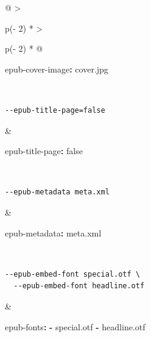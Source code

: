 \documentclass[
]{article}
\newenvironment{Shaded}{}{}
\newcommand{\AttributeTok}[1]{\textcolor[rgb]{0.49,0.56,0.16}{#1}}
\newcommand{\CharTok}[1]{\textcolor[rgb]{0.25,0.44,0.63}{#1}}
\newcommand{\FunctionTok}[1]{\textcolor[rgb]{0.02,0.16,0.49}{#1}}
\newcommand{\KeywordTok}[1]{\textcolor[rgb]{0.00,0.44,0.13}{\textbf{#1}}}
\begin{document}
\begin{longtable}[]{@{}
  >{\raggedright\arraybackslash}p{(\columnwidth - 2\tabcolsep) * }
  >{\raggedright\arraybackslash}p{(\columnwidth - 2\tabcolsep) * }@{}}
\begin{minipage}[t]{\linewidth}
\begin{Shaded}
\begin{Highlighting}[]
\FunctionTok{epub{-}cover{-}image}\KeywordTok{:}\AttributeTok{ cover.jpg}
\end{Highlighting}
\end{Shaded}
\end{minipage} \\
\begin{minipage}[t]{\linewidth}\raggedright
\begin{verbatim}
--epub-title-page=false
\end{verbatim}
\end{minipage} & \begin{minipage}[t]{\linewidth}\raggedright
\begin{Shaded}
\begin{Highlighting}[]
\FunctionTok{epub{-}title{-}page}\KeywordTok{:}\AttributeTok{ }\CharTok{false}
\end{Highlighting}
\end{Shaded}
\end{minipage} \\
\begin{minipage}[t]{\linewidth}\raggedright
\begin{verbatim}
--epub-metadata meta.xml
\end{verbatim}
\end{minipage} & \begin{minipage}[t]{\linewidth}\raggedright
\begin{Shaded}
\begin{Highlighting}[]
\FunctionTok{epub{-}metadata}\KeywordTok{:}\AttributeTok{ meta.xml}
\end{Highlighting}
\end{Shaded}
\end{minipage} \\
\begin{minipage}[t]{\linewidth}\raggedright
\begin{verbatim}
--epub-embed-font special.otf \
  --epub-embed-font headline.otf
\end{verbatim}
\end{minipage} & \begin{minipage}[t]{\linewidth}\raggedright
\begin{Shaded}
\begin{Highlighting}[]
\FunctionTok{epub{-}fonts}\KeywordTok{:}
\AttributeTok{  }\KeywordTok{{-}}\AttributeTok{ special.otf}
\AttributeTok{  }\KeywordTok{{-}}\AttributeTok{ headline.otf}

\end{Highlighting}
\end{Shaded}
\end{minipage}
\end{longtable}
\end{document}
